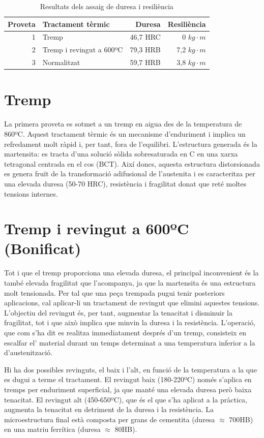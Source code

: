 \documentclass[a4paper]{report}
\begin{document}
\begin{table}[H]
	\centering
	\begin{tabular}{|r|lrr|}
		\hline
		Proveta & Tractament tèrmic & Duresa  & Resiliència \\
		\hline
		1 & Tremp & 46,7 HRC & 0 $kg \cdot m$ \\
		2 & Tremp i revingut a 600ºC & 79,3 HRB & 7,2 $kg \cdot m$ \\
		3 & Normalitzat & 59,7 HRB & 3,8 $kg \cdot m$ \\
		\hline
	\end{tabular}
	\caption{Resultats dels assaig de duresa i resiliència}
	\label{tab:tract-assaigs}
\end{table}

\section{Tremp}
La primera proveta es sotmet a un tremp en aigua des de la temperatura de 860ºC. Aquest tractament tèrmic és un mecanisme d'enduriment i implica un refredament molt ràpid i, per tant, fora de l'equilibri. L'estructura generada és la martensita: es tracta d'una solució sòlida sobresaturada en C en una xarxa tetragonal centrada en el cos (BCT). Així doncs, aquesta estructura distorsionada es genera fruït de la transformació adifusional de l'austenita i es caracteritza per una elevada duresa (50-70 HRC), resistència i fragilitat donat que reté moltes tensions internes. 

\section{Tremp i revingut a 600ºC (Bonificat)}

Tot i que el tremp proporciona una elevada duresa, el principal inconvenient és la també elevada fragilitat que l'acompanya, ja que la martensita és una estructura molt tensionada. Per tal que una peça trempada pugui tenir posteriors aplicacions, cal aplicar-li un tractament de revingut que elimini aquestes tensions. L'objectiu del revingut és, per tant, augmentar la tenacitat i disminuir la fragilitat, tot i que això implica que minvin la duresa i la resistència. L'operació, que com s'ha dit es realitza immediatament després d'un tremp, consisteix en escalfar el' material durant un temps determinat a una temperatura inferior a la d'austenització. 

Hi ha dos possibles revinguts, el baix i l'alt, en funció de la temperatura a la que es dugui a terme el tractament. El revingut baix (180-220ºC) només s'aplica en tremps per enduriment superficial, ja que manté una elevada duresa però baixa tenacitat. El revingut alt (450-650ºC), que és el que s'ha aplicat a la pràctica, augmenta la tenacitat en detriment de la duresa i la resistència. La microestructura final està composta per grans de cementita (duresa $\approx$ 700HB) en una matriu ferrítica (duresa $\approx$ 80HB).
\end{document}
